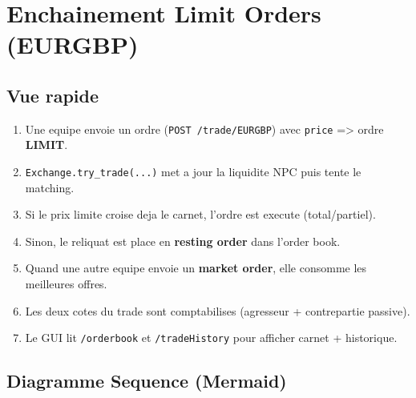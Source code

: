 \documentclass[
]{article}
\author{}
\date{\vspace{-2.5em}}
\providecommand{\tightlist}{%
  \setlength{\itemsep}{0pt}\setlength{\parskip}{0pt}}
\begin{document}
\section{Enchainement Limit Orders
(EURGBP)}\label{enchainement-limit-orders-eurgbp}

\subsection{Vue rapide}\label{vue-rapide}

\begin{enumerate}
\def\labelenumi{\arabic{enumi}.}
\tightlist
\item
  Une equipe envoie un ordre (\texttt{POST\ /trade/EURGBP}) avec
  \texttt{price} =\textgreater{} ordre \textbf{LIMIT}.
\item
  \texttt{Exchange.try\_trade(...)} met a jour la liquidite NPC puis
  tente le matching.
\item
  Si le prix limite croise deja le carnet, l'ordre est execute
  (total/partiel).
\item
  Sinon, le reliquat est place en \textbf{resting order} dans l'order
  book.
\item
  Quand une autre equipe envoie un \textbf{market order}, elle consomme
  les meilleures offres.
\item
  Les deux cotes du trade sont comptabilises (agresseur + contrepartie
  passive).
\item
  Le GUI lit \texttt{/orderbook} et \texttt{/tradeHistory} pour afficher
  carnet + historique.
\end{enumerate}

\subsection{Diagramme Sequence
(Mermaid)}\label{diagramme-sequence-mermaid}
\end{document}
